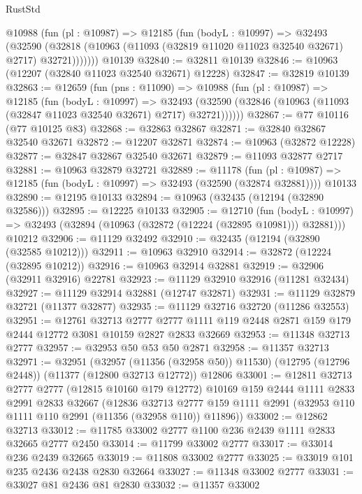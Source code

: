 \begin{lexlean}{RustStd}
\begin{coremodule}
      @10988
        (fun (pl : @10987) =>
        @12185
          (fun (bodyL : @10997) =>
          @32493
            (@32590
              (@32818 (@10963 (@11093 (@32819 @11020 @11023 @32540 @32671) @2717) @32721)))))))
    @10139
@32840 := @32811 @10139
@32846 := @10963 (@12207 (@32840 @11023 @32540 @32671) @12228)
@32847 := @32819 @10139
@32863 := @12659
    (fun (pns : @11090) =>
    @10988
      (fun (pl : @10987) =>
      @12185
        (fun (bodyL : @10997) =>
        @32493 (@32590 (@32846 (@10963 (@11093 (@32847 @11023 @32540 @32671) @2717) @32721))))))
@32867 := @77 @10116 (@77 @10125 @83)
@32868 := @32863 @32867
@32871 := @32840 @32867 @32540 @32671
@32872 := @12207 @32871
@32874 := @10963 (@32872 @12228)
@32877 := @32847 @32867 @32540 @32671
@32879 := @11093 @32877 @2717
@32881 := @10963 @32879 @32721
@32889 := @11178
    (fun (pl : @10987) => @12185 (fun (bodyL : @10997) => @32493 (@32590 (@32874 @32881))))
    @10133
@32890 := @12195 @10133
@32894 := @10963 (@32435 (@12194 (@32890 @32586)))
@32895 := @12225 @10133
@32905 := @12710
    (fun (bodyL : @10997) => @32493 (@32894 (@10963 (@32872 (@12224 (@32895 @10981))) @32881)))
    @10212
@32906 := @11129 @32492
@32910 := @32435 (@12194 (@32890 (@32585 @10212)))
@32911 := @10963 @32910
@32914 := @32872 (@12224 (@32895 @10212))
@32916 := @10963 @32914 @32881
@32919 := @32906 (@32911 @32916) @22781
@32923 := @11129 @32910 @32916 (@11281 @32434)
@32927 := @11129 @32914 @32881 (@12747 @32871)
@32931 := @11129 @32879 @32721 (@11377 @32877)
@32935 := @11129 @32716 @32720 (@11286 @32553)
@32951 := @12761
    @32713
    @2777
    @2777
    @1111
    @119
    @2448
    @2871
    @159
    @179
    @2444
    @12772
    @3081
    @10159
    @2827
    @2833
    @32669
@32953 := @11348 @32713 @2777
@32957 := @32953 @50 @53 @50 @2871
@32958 := @11357 @32713
@32971 := @32951
    (@32957 (@11356 (@32958 @50)) @11530)
    (@12795 (@12796 @2448))
    (@11377 (@12800 @32713 @12772))
    @12806
@33001 := @12811
    @32713
    @2777
    @2777
    (@12815 @10160 @179 @12772)
    @10169
    @159
    @2444
    @1111
    @2833
    @2991
    @2833
    @32667
    (@12836
      @32713
      @2777
      @159
      @1111
      @2991
      (@32953 @110 @1111 @110 @2991 (@11356 (@32958 @110)) @11896))
@33002 := @12862 @32713
@33012 := @11785 @33002 @2777 @1100 @236 @2439 @1111 @2833 @32665 @2777 @2450
@33014 := @11799 @33002 @2777
@33017 := @33014 @236 @2439 @32665
@33019 := @11808 @33002 @2777
@33025 := @33019 @101 @235 @2436 @2438 @2830 @32664
@33027 := @11348 @33002 @2777
@33031 := @33027 @81 @2436 @81 @2830
@33032 := @11357 @33002

\end{coremodule}
\end{lexlean}
